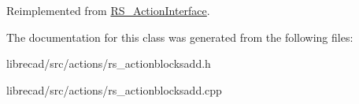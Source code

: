 Reimplemented from \hyperlink{classRS__ActionInterface_aa2ba8f6f697f735eace4ec5449c0b8cd}{R\-S\-\_\-\-Action\-Interface}.



The documentation for this class was generated from the following files\-:\begin{DoxyCompactItemize}
\item 
librecad/src/actions/rs\-\_\-actionblocksadd.\-h\item 
librecad/src/actions/rs\-\_\-actionblocksadd.\-cpp\end{DoxyCompactItemize}

